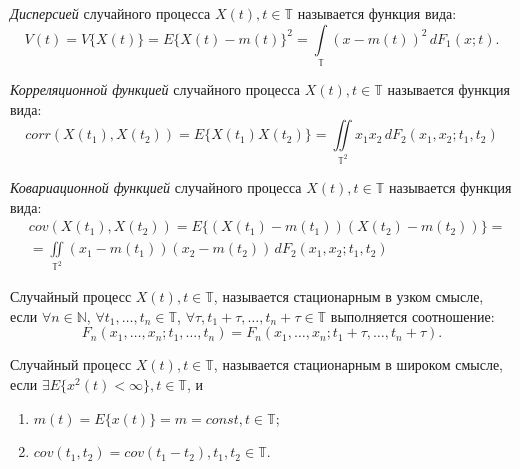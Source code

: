 \textit{Дисперсией} случайного процесса $ X(t), t \in \mathbb{T} $ называется функция вида:
\begin{equation*}
	V(t) = V \{ X(t) \} = E \{ X(t) - m(t) \}^2 = \int \limits_{\mathbb{T}} (x - m(t))^2 \, dF_1(x; t).
\end{equation*}


\textit{Корреляционной функцией} случайного процесса $ X(t), t \in \mathbb{T} $ называется функция вида:
\begin{equation*}
	corr(X(t_1), X(t_2)) = E \{ X(t_1)X(t_2) \} = \iint \limits_{\mathbb{T}^2} x_1 x_2 \, dF_2(x_1, x_2; t_1, t_2)
\end{equation*}

\textit{Ковариационной функцией} случайного процесса $ X(t), t \in \mathbb{T} $ называется функция вида:
\begin{eqnarray*}
	& cov(X(t_1), X(t_2)) = E \{ (X(t_1) - m(t_1)) (X(t_2) - m(t_2)) \} = \\
	& = \iint \limits_{\mathbb{T}^2} (x_1 - m(t_1)) (x_2 - m(t_2)) \, dF_2(x_1, x_2; t_1, t_2)
\end{eqnarray*}


Случайный процесс $ X(t), t \in \mathbb{T} $, называется стационарным в узком смысле, если $ \forall n \in \mathbb{N} $, $ \forall t_1, \dots, t_n \in \mathbb{T} $, $ \forall \tau, t_1 + \tau, \dots, t_n + \tau \in \mathbb{T} $ выполняется соотношение:
\begin{equation*}
	F_n(x_1, \dots, x_n; t_1, \dots, t_n) = F_n(x_1, \dots, x_n; t_1 + \tau , \dots, t_n + \tau).
\end{equation*}

Случайный процесс $X (t), t \in \mathbb{T} $, называется стационарным в широком смысле, если $ \exists E \{ x^2(t) < \infty \}, t \in \mathbb{T} $, и
\begin{enumerate}
	\item $ m(t) = E \{ x(t) \} = m = const, t \in \mathbb{T} $;
	\item $ cov(t_1, t_2) = cov(t_1 - t_2), t_1,t_2 \in \mathbb{T} $.
\end{enumerate}

